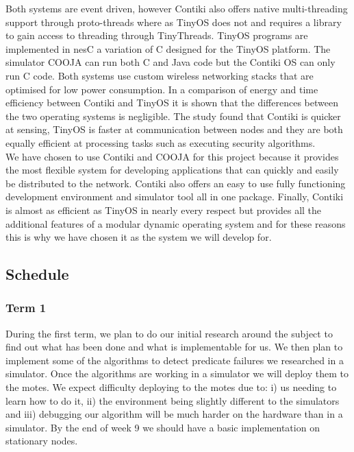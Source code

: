 \documentclass[a4paper]{article}
\begin{document}
Both systems are event driven, however Contiki also offers native multi-threading support through proto-threads where as TinyOS does not and requires a library to gain access to threading through TinyThreads\cite{?}. TinyOS programs are implemented in nesC a variation of C designed for the TinyOS platform. The simulator COOJA can run both C and Java code but the Contiki OS can only run C code. Both systems use custom wireless networking stacks that are optimised for low power consumption. In a comparison of energy and time efficiency between Contiki and TinyOS\cite{?} it is shown that the differences between the two operating systems is negligible. The study found that Contiki is quicker at sensing, TinyOS is faster at communication between nodes and they are both equally efficient at processing tasks such as executing security algorithms.\\

We have chosen to use Contiki and COOJA for this project because it provides the most flexible system for developing applications that can quickly and easily be distributed to the network. Contiki also offers an easy to use fully functioning development environment and simulator tool all in one package. Finally, Contiki is almost as efficient as TinyOS in nearly every respect but provides all the additional features of a modular dynamic operating system and for these reasons this is why we have chosen it as the system we will develop for.  

\subsection{Schedule}

\subsubsection{Term 1}

During the first term, we plan to do our initial research around the subject to find out what has been done and what is implementable for us. We then plan to implement some of the algorithms to detect predicate failures we researched in a simulator. Once the algorithms are working in a simulator we will deploy them to the motes. We expect difficulty deploying to the motes due to: i) us needing to learn how to do it, ii) the environment being slightly different to the simulators and iii) debugging our algorithm will be much harder on the hardware than in a simulator. By the end of week 9 we should have a basic implementation on stationary nodes.
\end{document}
